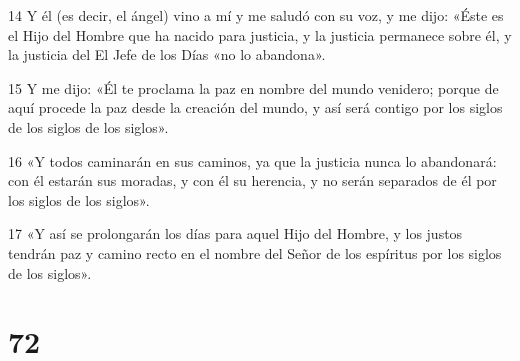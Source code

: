 \par 14 Y él (es decir, el ángel) vino a mí y me saludó con su voz, y me dijo: «Éste es el Hijo del Hombre que ha nacido para justicia, y la justicia permanece sobre él, y la justicia del El Jefe de los Días «no lo abandona».
\par 15 Y me dijo: «Él te proclama la paz en nombre del mundo venidero; porque de aquí procede la paz desde la creación del mundo, y así será contigo por los siglos de los siglos de los siglos».
\par 16 «Y todos caminarán en sus caminos, ya que la justicia nunca lo abandonará: con él estarán sus moradas, y con él su herencia, y no serán separados de él por los siglos de los siglos».
\par 17 «Y así se prolongarán los días para aquel Hijo del Hombre, y los justos tendrán paz y camino recto en el nombre del Señor de los espíritus por los siglos de los siglos».


\chapter{72}

